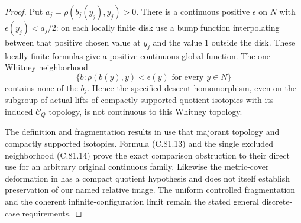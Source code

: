 \begin{proof}
Put $a_j=\rho(b_j(y_j),y_j)>0$. There is
a continuous positive $\epsilon$ on $N$
with $\epsilon(y_j)<a_j/2$: on each
locally finite disk use a bump function
interpolating between that positive chosen
value at $y_j$ and the value $1$ outside
the disk. These locally finite formulas
give a positive continuous global function.
The one Whitney neighborhood
\[
 \{b:\rho(b(y),y)<\epsilon(y)\text{ for every }y\in N\}
                                                               \tag{C.81.14}
\]
contains none of the $b_j$. Hence the
specified descent homomorphism, even on
the subgroup of actual lifts of compactly
supported quotient isotopies with its
induced $\mathscr C_Q$ topology, is not
continuous to this Whitney topology.

The definition and fragmentation results
in \cite[p.~395 and \S2, Proposition~2.9,
Corollary~2.10]{C_LechMichalikRybicki2018}
use that majorant topology and compactly
supported isotopies. Formula (C.81.13)
and the single excluded neighborhood
(C.81.14) prove the exact comparison
obstruction to their direct use for an
arbitrary original continuous family.
Likewise the metric-cover deformation
in \cite[Theorem~1.1]{C_YagasakiUniform2014}
has a compact quotient hypothesis and
does not itself establish preservation
of our named relative image. The uniform
controlled fragmentation and the coherent
infinite-configuration limit remain the
stated general discrete-case requirements.
\end{proof}
